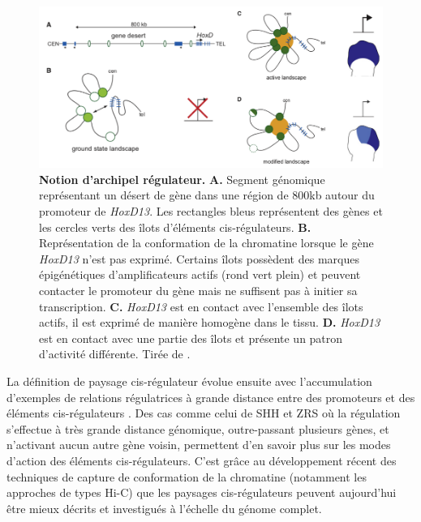 \begin{figure}[h]
 \centering
 \includegraphics[width=1\textwidth, page=1] {figures/introduction/fig21.png}
 \caption[Notion d'archipel régulateur.]{
 \textbf{Notion d'archipel régulateur.}
 \textbf{A.} Segment génomique représentant un désert de gène dans une région de 800kb autour du promoteur de \textit{HoxD13}. Les rectangles bleus représentent des gènes et les cercles verts des îlots d'éléments \gls{cis}-régulateurs. \textbf{B.} Représentation de la conformation de la chromatine lorsque le gène \textit{HoxD13} n'est pas exprimé. Certains îlots possèdent des marques épigénétiques d'\glspl{amplificateur} actifs (rond vert plein) et peuvent contacter le promoteur du gène mais ne suffisent pas à initier sa transcription. \textbf{C.} \textit{HoxD13} est en contact avec l'ensemble des îlots actifs, il est exprimé de manière homogène dans le tissu. \textbf{D.} \textit{HoxD13} est en contact avec une partie des îlots et présente un patron d'activité différente. Tirée de \citet{montavon_regulatory_2011}. \\
 }
 \label{fig:Fig21}
\end{figure}

La définition de paysage \gls{cis}-régulateur évolue ensuite avec l’accumulation d’exemples de relations régulatrices à grande distance entre des promoteurs et des éléments \gls{cis}-régulateurs \citep{montavon_landscapes_2012}. Des cas comme celui de \acrshort{SHH} et \acrshort{ZRS} où la régulation s’effectue à très grande distance génomique, outre-passant plusieurs gènes, et n'activant aucun autre gène voisin, permettent d’en savoir plus sur les modes d’action des éléments \gls{cis}-régulateurs. C’est grâce au développement récent des techniques de capture de conformation de la chromatine (notamment les approches de types \acrshort{Hi-C}) que les paysages \gls{cis}-régulateurs peuvent aujourd’hui être mieux décrits et investigués à l’échelle du génome complet. \\

